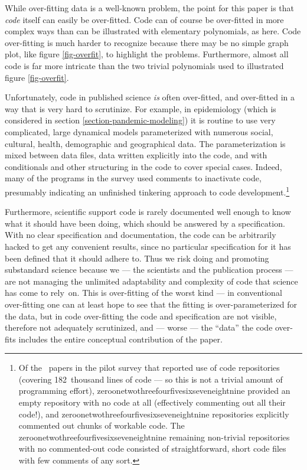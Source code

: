 \documentclass{comjnl}
\def\numbertoname#1{\ifcase #1 zero\or one\or two\or three\or four\or five\or six\or seven\or eight\or nine\else #1\fi}
\begin{document}
While over-fitting data is a well-known problem, the point for this paper is that \emph{code\/} itself can easily be over-fitted. Code can of course be over-fitted in more complex ways than can be illustrated with elementary polynomials, as here. Code over-fitting is much harder to recognize because there may be no simple graph plot, like figure \ref{fig-overfit}, to highlight the problems. Furthermore, almost all code is far more intricate than the two trivial polynomials used to illustrated figure \ref{fig-overfit}. 

Unfortunately, code in published science \emph{is\/} often over-fitted, and over-fitted in a way that is very hard to scrutinize. For example, in epidemiology (which is considered in section \ref{section-pandemic-modeling}) it is routine to use very complicated, large dynamical models parameterized with numerous social, cultural, health, demographic and geographical data. The parameterization is mixed between data files, data written explicitly into the code, and with conditionals and other structuring in the code to cover special cases. Indeed, many of the programs in the survey used comments to inactivate code, presumably indicating an unfinished tinkering approach to code development.\footnote{Of the \the\countUsesVersionControlRepository\ papers in the pilot survey that reported use of code repositories (covering %
\def\totalkLOC{182}%
\totalkLOC\ thousand lines of code --- so this is not a trivial amount of programming effort), \numbertoname{\the\countMissingCode} provided an empty repository with no code at all (effectively commenting out all their code!), and \numbertoname{\the\countCommentedOut} repositories explicitly commented out chunks of workable code. The \numbertoname{\the\countNotCommentedOut} remaining non-trivial repositories with no commented-out code consisted of straightforward, short code files with few comments of any sort.\label{name-example-footnote}}

Furthermore, scientific support code is rarely documented well enough to know what it should have been doing, which should be answered by a specification. With no clear specification and documentation, the code can be arbitrarily hacked to get any convenient results, since no particular specification for it has been defined that it should adhere to. Thus we risk doing and promoting substandard science because we --- the scientists and the publication process --- are not managing the unlimited adaptability and complexity of code that science has come to rely~on. This is over-fitting of the worst kind --- in conventional over-fitting one can at least hope to see that the fitting is over-parameterized for the data, but in code over-fitting the code and specification are not visible, therefore not adequately scrutinized, and --- worse --- the ``data'' the code over-fits includes the entire conceptual contribution of the paper. 
\end{document}
